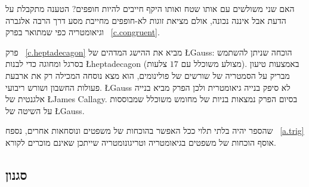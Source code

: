האם שני משולשים עם אותו שטח ואותו היקף חייבים להיות חופפים? הטענה מתקבלת על הדעת אבל איננה נכונה, אולם מציאת זוגות לא-חופפים מחייבת מסע דרך הרבה אלגברה וגיאומטריה כפי שמתואר בפרק~%
\ref{c.congruent}.


פרק~%
\ref{c.heptadecagon}
מביא את ההישג המדהים של 
\L{Gauss}:
הוכחה שניתן להשתמש בסרגל ומחוגה כדי לבנות 
\L{heptadecagon}
(מצולע משוכלל עם $17$ צלעות). באמצעות טיעון מבריק על הסמטריה של שורשים של פולינומים, הוא מצא נוסחה המכילה רק את ארבעת פעולות החשבון ושורש ריבועי. 
\L{Gauss}
לא סיפק בנייה גיאומטרית ולכן הפרק מביא בנייה אלגנטית של 
\L{James Callagy}.
בסיום הפרק נמצאות בניות של מחומש משוכלל שמבוססות על השיטה של
\L{Gauss}.



 שהספר יהיה בלתי תלוי ככל האפשר בהוכחות של משפטים ונוסחאות אחרים, נספח%
~\ref{a.trig}
אוסף הוכחות של משפטים בגיאומטריה וטריגונומטריה שייתכן שאינם מוכרים לקורא.


\subsection*{סגנון}

